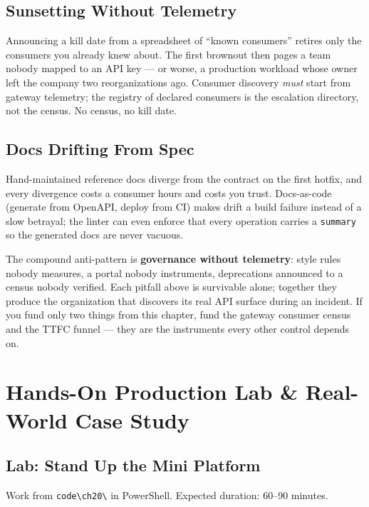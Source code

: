 \subsection{Sunsetting Without Telemetry}
\label{pit:notelemetry}
Announcing a kill date from a spreadsheet of ``known consumers'' retires
only the consumers you already knew about. The first brownout then
pages a team nobody mapped to an API key --- or worse, a production
workload whose owner left the company two reorganizations ago. Consumer
discovery \emph{must} start from gateway telemetry; the registry of
declared consumers is the escalation directory, not the census. No
census, no kill date.

\subsection{Docs Drifting From Spec}
\label{pit:docs-drift}
Hand-maintained reference docs diverge from the contract on the first
hotfix, and every divergence costs a consumer hours and costs you trust.
Docs-as-code (generate from OpenAPI, deploy from CI) makes drift a build
failure instead of a slow betrayal; the linter can even enforce that
every operation carries a \texttt{summary} so the generated docs are
never vacuous.

\begin{warningbox}
The compound anti-pattern is \textbf{governance without telemetry}:
style rules nobody measures, a portal nobody instruments, deprecations
announced to a census nobody verified. Each pitfall above is survivable
alone; together they produce the organization that discovers its real
API surface during an incident. If you fund only two things from this
chapter, fund the gateway consumer census and the TTFC funnel --- they
are the instruments every other control depends on.
\end{warningbox}

\section{Hands-On Production Lab \& Real-World Case Study}
\label{sec:ch20-lab}

\subsection{Lab: Stand Up the Mini Platform}
Work from \texttt{code\textbackslash{}ch20\textbackslash{}} in PowerShell.
Expected duration: 60--90 minutes.

